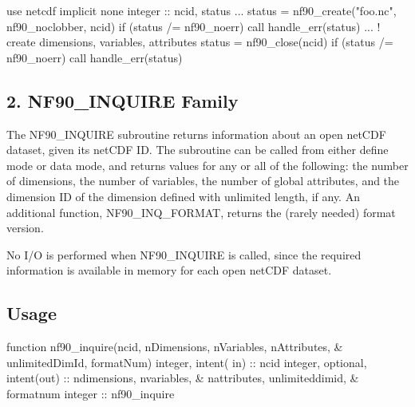 \begin{DoxyCode}
\textcolor{keywordtype}{use }netcdf
\textcolor{keywordtype}{implicit none}
\textcolor{keywordtype}{integer} :: ncid, status
...
status = nf90\_create(\textcolor{stringliteral}{"foo.nc"}, nf90\_noclobber, ncid)
\textcolor{keywordflow}{if} (status /= nf90\_noerr) \textcolor{keyword}{call }handle\_err(status)
...  \textcolor{comment}{!  create dimensions, variables, attributes}
status = nf90\_close(ncid)
\textcolor{keywordflow}{if} (status /= nf90\_noerr) \textcolor{keyword}{call }handle\_err(status)
\end{DoxyCode}
\hypertarget{f90_datasets_f90-nf90_inquire-family}{}\subsection{2. N\+F90\+\_\+\+I\+N\+Q\+U\+I\+R\+E Family }\label{f90_datasets_f90-nf90_inquire-family}
The N\+F90\+\_\+\+I\+N\+Q\+U\+I\+RE subroutine returns information about an open net\+C\+DF dataset, given its net\+C\+DF ID. The subroutine can be called from either define mode or data mode, and returns values for any or all of the following\+: the number of dimensions, the number of variables, the number of global attributes, and the dimension ID of the dimension defined with unlimited length, if any. An additional function, N\+F90\+\_\+\+I\+N\+Q\+\_\+\+F\+O\+R\+M\+AT, returns the (rarely needed) format version.

No I/O is performed when N\+F90\+\_\+\+I\+N\+Q\+U\+I\+RE is called, since the required information is available in memory for each open net\+C\+DF dataset.

\subsection*{Usage}


\begin{DoxyCode}
\textcolor{keyword}{function }nf90\_inquire(ncid, nDimensions, nVariables, nAttributes, &
                      unlimitedDimId, formatNum)
  \textcolor{keywordtype}{integer},           \textcolor{keywordtype}{intent( in)} :: ncid
  \textcolor{keywordtype}{integer}, \textcolor{keywordtype}{optional}, \textcolor{keywordtype}{intent(out)} :: ndimensions, nvariables, &
                                    nattributes, unlimiteddimid, &
                                    formatnum
  \textcolor{keywordtype}{integer}                        :: nf90\_inquire
\end{DoxyCode}


